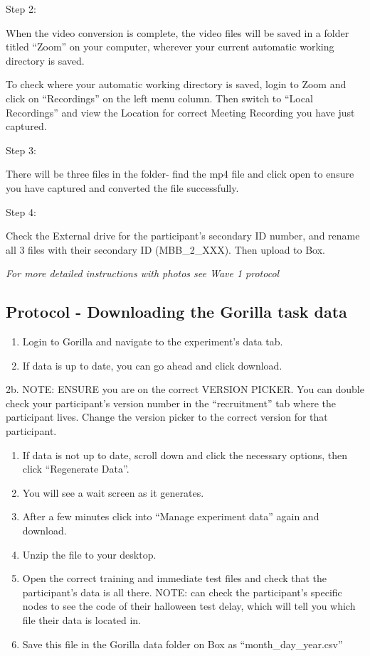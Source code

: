 \documentclass[]{book}
\begin{document}
Step 2:

When the video conversion is complete, the video files will be saved in a folder titled ``Zoom'' on your computer, wherever your current automatic working directory is saved.

To check where your automatic working directory is saved, login to Zoom and click on ``Recordings'' on the left menu column. Then switch to ``Local Recordings'' and view the Location for correct Meeting Recording you have just captured.

Step 3:

There will be three files in the folder- find the mp4 file and click open to ensure you have captured and converted the file successfully.

Step 4:

Check the External drive for the participant's secondary ID number, and rename all 3 files with their secondary ID (MBB\_2\_XXX). Then upload to Box.

\emph{For more detailed instructions with photos see Wave 1 protocol}

\hypertarget{protocol---downloading-the-gorilla-task-data-1}{%
\subsection{Protocol - Downloading the Gorilla task data}\label{protocol---downloading-the-gorilla-task-data-1}}

\begin{enumerate}
\def\labelenumi{\arabic{enumi}.}
\item
  Login to Gorilla and navigate to the experiment's data tab.
\item
  If data is up to date, you can go ahead and click download.
\end{enumerate}

2b. NOTE: ENSURE you are on the correct VERSION PICKER. You can double check your participant's version number in the ``recruitment'' tab where the participant lives. Change the version picker to the correct version for that participant.

\begin{enumerate}
\def\labelenumi{\arabic{enumi}.}
\setcounter{enumi}{2}
\item
  If data is not up to date, scroll down and click the necessary options, then click ``Regenerate Data''.
\item
  You will see a wait screen as it generates.
\item
  After a few minutes click into ``Manage experiment data'' again and download.
\item
  Unzip the file to your desktop.
\item
  Open the correct training and immediate test files and check that the participant's data is all there. NOTE: can check the participant's specific nodes to see the code of their halloween test delay, which will tell you which file their data is located in.
\item
  Save this file in the Gorilla data folder on Box as ``month\_day\_year.csv''
\end{enumerate}
\end{document}
